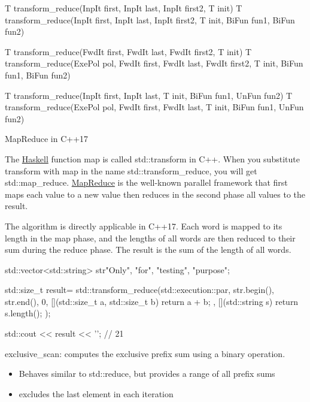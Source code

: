 \begin{cpp}
T transform_reduce(InpIt first, InpIt last, InpIt first2, T init)
T transform_reduce(InpIt first, InpIt last,
				   InpIt first2, T init, BiFun fun1, BiFun fun2)

T transform_reduce(FwdIt first, FwdIt last, FwdIt first2, T init)
T transform_reduce(ExePol pol, FwdIt first, FwdIt last,
				   FwdIt first2, T init, BiFun fun1, BiFun fun2)

T transform_reduce(InpIt first, InpIt last, T init, BiFun fun1, UnFun fun2)
T transform_reduce(ExePol pol, FwdIt first, FwdIt last,
				   T init, BiFun fun1, UnFun fun2)
\end{cpp}

\begin{myTip}{MapReduce in C++17}

The \href{https://www.haskell.org/}{Haskell} function map is called std::transform in C++. When you substitute transform with map in the name std::transform\_reduce, you will get std::map\_reduce. \href{https://en.wikipedia.org/wiki/MapReduce}{MapReduce} is the well-known parallel framework that first maps each value to a new value then reduces in the second phase all values to the result.

The algorithm is directly applicable in C++17. Each word is mapped to its length in the map phase, and the lengths of all words are then reduced to their sum during the reduce phase. The result is the sum of the length of all words.

\begin{cpp}
std::vector<std::string> str{"Only", "for", "testing", "purpose"};

std::size_t result= std::transform_reduce(std::execution::par,
				str.begin(), str.end(), 0,
				[](std::size_t a, std::size_t b){ return a + b; },
				[](std::string s){ return s.length(); });

std::cout << result << '\n'; // 21
\end{cpp}

\end{myTip}

exclusive\_scan: computes the exclusive prefix sum using a binary operation.

\begin{itemize}
\item
Behaves similar to std::reduce, but provides a range of all prefix sums

\item
excludes the last element in each iteration
\end{itemize}

